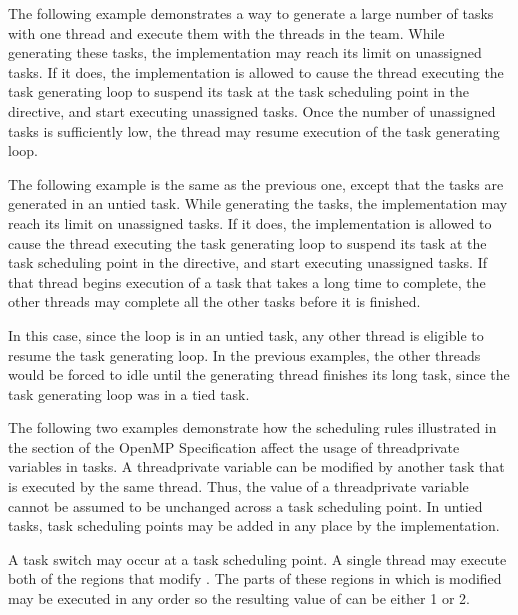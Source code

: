 The following example demonstrates a way to generate a large number of tasks with 
one thread and execute them with the threads in the team. While generating these 
tasks, the implementation may reach its limit on unassigned tasks.  If it does, 
the implementation is allowed to cause the thread executing the task generating 
loop to suspend its task at the task scheduling point in the  directive, 
and start executing unassigned tasks.  Once the number of unassigned tasks is sufficiently 
low, the thread may resume execution of the task generating loop.



The following example is the same as the previous one, except that the tasks are 
generated in an untied task. While generating the tasks, the implementation may 
reach its limit on unassigned tasks. If it does, the implementation is allowed 
to cause the thread executing the task generating loop to suspend its task at the 
task scheduling point in the  directive, and start executing unassigned 
tasks.  If that thread begins execution of a task that takes a long time to complete, 
the other threads may complete all the other tasks before it is finished.

In this case, since the loop is in an untied task, any other thread is eligible 
to resume the task generating loop. In the previous examples, the other threads 
would be forced to idle until the generating thread finishes its long task, since 
the task generating loop was in a tied task.



The following two examples demonstrate how the scheduling rules illustrated in 
the  section of the OpenMP Specification affect the usage of
threadprivate variables in tasks. A threadprivate 
variable can be modified by another task that is executed by the same thread. Thus, 
the value of a threadprivate variable cannot be assumed to be unchanged 
across a task scheduling point. In untied tasks, task scheduling points may be 
added in any place by the implementation.

A task switch may occur at a task scheduling point. A single thread may execute 
both of the  regions that modify . The parts of these  regions 
in which  is modified may be executed in any order so the resulting 
value of  can be either 1 or 2.

